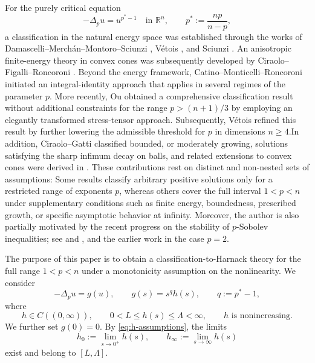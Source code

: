 \documentclass[reqno,12pt]{amsart}
\numberwithin{equation}{section}
\theoremstyle{remark}
\newcommand{\R}{\mathbb R}
\begin{document}
For the purely critical equation
\begin{equation}\label{eq:intro-pure-critical}
 -\Delta_p u = u^{p^*-1}\quad\text{in }\R^n,
 \qquad p^*:=\frac{np}{n-p},
\end{equation}
a classification in the natural energy space was established through the works of Damascelli--Merchán--Montoro--Sciunzi \cite{DMMS2014}, V\'etois \cite{V2016}, and Sciunzi \cite{S2016}. An anisotropic finite-energy theory in convex cones was subsequently developed by Ciraolo--Figalli--Roncoroni \cite{CFR2020}. Beyond the energy framework, Catino--Monticelli--Roncoroni \cite{CMR2023} initiated an integral-identity approach that applies in several regimes of the parameter $p$. More recently, Ou \cite{O2025} obtained a comprehensive classification result without additional constraints for the range $p>(n+1)/3$ by employing an elegantly transformed stress-tensor approach. Subsequently, V\'etois \cite{V2024} refined this result by further lowering the admissible threshold for $p$ in dimensions $n\ge4$.In addition, Ciraolo–Gatti \cite{CG2026} classified bounded, or moderately growing, solutions satisfying the sharp  infimum decay on balls, and related extensions to convex cones were derived in \cite{CDGL2026}. These contributions rest on distinct and non-nested sets of assumptions: Some results classify arbitrary positive solutions only for a restricted range of exponents $p$, whereas others cover the full interval $1<p<n$ under supplementary conditions such as finite energy, boundedness, prescribed growth, or specific asymptotic behavior at infinity. Moreover, the author is also partially motivated by the recent progress on the stability of $p$-Sobolev inequalities; see \cite{CFMP2009, FN2019,FZ2022,CG20262} and \cite{LZ2025}, and the earlier work \cite{BE1991, CFM2018, FG2020, DSW2025} in the case $p=2$.

The purpose of this paper is to obtain a classification-to-Harnack theory for the full range $1<p<n$ under a monotonicity assumption on the nonlinearity.
We consider
\begin{equation}\label{eq:g-structure}
 -\Delta_pu=g(u),  \qquad  g(s)=s^q h(s),  \qquad  q:=p^*-1,
\end{equation}
where
\begin{equation}\label{eq:h-assumptions}
 h\in C((0,\infty)),  \qquad  0<L\le h(s)\le\Lambda<\infty,
 \qquad  h\text{ is nonincreasing}.
\end{equation}
We further set $g(0)=0$.  By \eqref{eq:h-assumptions}, the limits
$$
 h_0:=\lim_{s\to 0^+}h(s),  \qquad h_\infty:=\lim_{s\to\infty}h(s)
$$
exist and belong to $[L,\Lambda]$.
\end{document}
